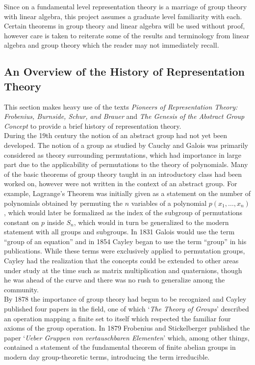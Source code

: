 Since on a fundamental level representation theory is a marriage of group theory with linear algebra, this project assumes a graduate level familiarity with each. Certain theorems in group theory and linear algebra will be used without proof, however care is taken to reiterate some of the results and terminology from linear algebra and group theory which the reader may not immediately recall.




\subsection{An Overview of the History of Representation Theory}
This section makes heavy use of the texts \textit{Pioneers of Representation Theory: Frobenius, Burnside, Schur, and Brauer} \cite{9} and \textit{The Genesis of the Abstract Group Concept} \cite{10} to provide a brief history of representation theory.\\

During the 19th century the notion of an abstract group had not yet been developed. The notion of a group as studied by Cauchy and Galois was primarily considered as theory surrounding permutations, which had importance in large part due to the applicability of permutations to the theory of polynomials. Many of the basic theorems of group theory taught in an introductory class had been worked on, however were not written in the context of an abstract group. For example, Lagrange's Theorem was initially given as a statement on the number of polynomials obtained by permuting the $n$ variables of a polynomial $p(x_1,\dots,x_n)$, which would later be formalized as the index of the subgroup of permutations constant on $p$ inside $S_n$, which would in turn be generalized to the modern statement with all groups and subgroups. In 1831 Galois would use the term ``group of an equation'' and in 1854 Cayley began to use the term ``group'' in his publications. While these terms were exclusively applied to permutation groups, Cayley had the realization that the concepts could be extended to other areas under study at the time such as matrix multiplication and quaternions, though he was ahead of the curve and there was no rush to generalize among the community.\\

By 1878 the importance of group theory had begun to be recognized and Cayley published four papers in the field, one of which `\textit{The Theory of Groups}' described an operation mapping a finite set to itself which respected the familiar four axioms of the group operation. In 1879 Frobenius and Stickelberger published the paper `\textit{Ueber Gruppen von vertauschbaren Elementen}' which, among other things, contained a statement of the fundamental theorem of finite abelian groups in modern day group-theoretic terms, introducing the term irreducible.\\

